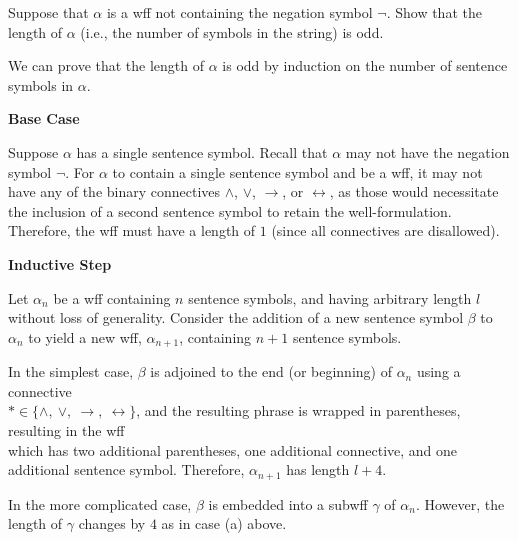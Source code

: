 \setcounter{problem}{4}

\begin{problem}
  Suppose that $\alpha$ is a wff not containing the negation symbol $\lnot$.
  Show that the length of $\alpha$ (i.e., the number of symbols in the string) is odd.

  \begin{Answer}
    We can prove that the length of $\alpha$ is odd by induction
    on the number of sentence symbols in $\alpha$.

    \textbf{\flushleft Base Case}~\label{base-case}
    
    Suppose $\alpha$ has a single sentence symbol.
    Recall that $\alpha$ may not have the negation symbol $\lnot$.
    For $\alpha$ to contain a single sentence symbol
    and be a wff, it may not have any of the binary connectives
    $\land$, $\lor$, $\rightarrow$, or $\leftrightarrow$, as those
    would necessitate the inclusion of a second sentence symbol to retain the well-formulation.
    Therefore, the wff must have a length of $1$ (since all connectives are disallowed).

    \textbf{\flushleft Inductive Step}

    Let $\alpha_n$ be a wff containing $n$ sentence symbols,
    and having arbitrary length $l$ without loss of generality.
    Consider the addition of a new sentence symbol $\beta$ to $\alpha_n$
    to yield a new wff, $\alpha_{n+1}$, containing $n+1$ sentence symbols.

    \begin{enumroman}
      \item In the simplest case, $\beta$ is adjoined to the end
        (or beginning) of $\alpha_n$
        using a connective  \\ $* \in \{ \land,\ \lor,\ \rightarrow,\ \leftrightarrow \}$,
      and the resulting phrase is wrapped in parentheses,
      resulting in the wff \\ 
which has two additional parentheses,
      one additional connective, and one additional sentence symbol.
      Therefore, $\alpha_{n+1}$ has length $l+4$.

      \item
      In the more complicated case, $\beta$ is embedded into a subwff $\gamma$ of $\alpha_n$.
      However, the length of $\gamma$ changes by $4$ as in case (a) above.
      
    \end{enumroman}


\end{Answer}
\end{problem}
